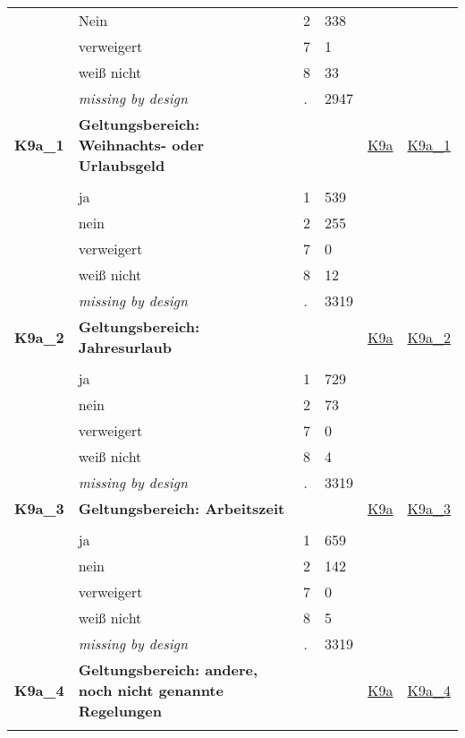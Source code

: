 \begin{longtable}{| L{2.45cm} | L{6cm} | C{1.5cm} | R{1cm} | C{2.25cm} | C{2.25cm} |}
   & Nein & 2 & 338 &  &  \\ 
   & verweigert & 7 & 1 &  &  \\ 
   & weiß nicht & 8 & 33 &  &  \\ 
   & \textit{missing by design} & \textit{.} & 2947 &  &  \\ 
   \midrule
\textbf{K9a\_1}\label{var:K9a:1} & \textbf{Geltungsbereich: Weihnachts- oder Urlaubsgeld} &  &  & \hyperref[K9a]{K9a} & \hyperref[var:suf:K9a:1]{K9a\_1} \\ 
   &  &  &  &  &  \\ 
   & ja & 1 & 539 &  &  \\ 
   & nein & 2 & 255 &  &  \\ 
   & verweigert & 7 & 0 &  &  \\ 
   & weiß nicht & 8 & 12 &  &  \\ 
   & \textit{missing by design} & \textit{.} & 3319 &  &  \\ 
   \midrule
\textbf{K9a\_2}\label{var:K9a:2} & \textbf{Geltungsbereich: Jahresurlaub} &  &  & \hyperref[K9a]{K9a} & \hyperref[var:suf:K9a:2]{K9a\_2} \\ 
   &  &  &  &  &  \\ 
   & ja & 1 & 729 &  &  \\ 
   & nein & 2 & 73 &  &  \\ 
   & verweigert & 7 & 0 &  &  \\ 
   & weiß nicht & 8 & 4 &  &  \\ 
   & \textit{missing by design} & \textit{.} & 3319 &  &  \\ 
   \midrule
\textbf{K9a\_3}\label{var:K9a:3} & \textbf{Geltungsbereich: Arbeitszeit} &  &  & \hyperref[K9a]{K9a} & \hyperref[var:suf:K9a:3]{K9a\_3} \\ 
   &  &  &  &  &  \\ 
   & ja & 1 & 659 &  &  \\ 
   & nein & 2 & 142 &  &  \\ 
   & verweigert & 7 & 0 &  &  \\ 
   & weiß nicht & 8 & 5 &  &  \\ 
   & \textit{missing by design} & \textit{.} & 3319 &  &  \\ 
   \midrule
\textbf{K9a\_4}\label{var:K9a:4} & \textbf{Geltungsbereich: andere, noch nicht genannte Regelungen} &  &  & \hyperref[K9a]{K9a} & \hyperref[var:suf:K9a:4]{K9a\_4} \\ 
   &  &  &  &  &  \\ 

\end{longtable}

